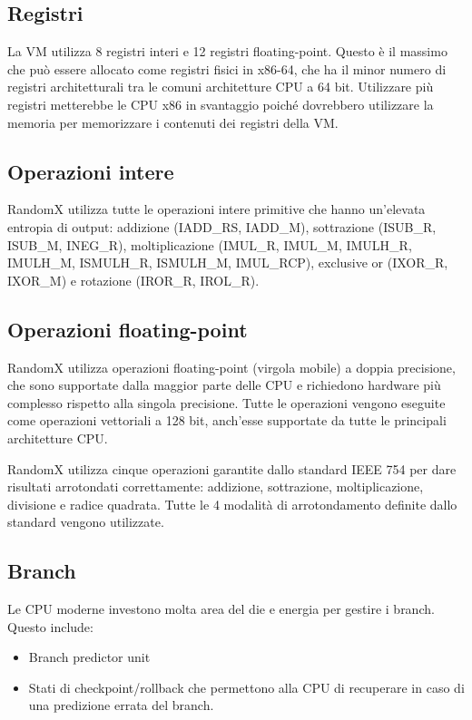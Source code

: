 \subsection{Registri}

La VM utilizza 8 registri interi e 12 registri floating-point. Questo è il massimo che può essere allocato come registri fisici in x86-64, che ha il minor numero di registri architetturali tra le comuni architetture CPU a 64 bit. Utilizzare più registri metterebbe le CPU x86 in svantaggio poiché dovrebbero utilizzare la memoria per memorizzare i contenuti dei registri della VM.

\subsection{Operazioni intere}

RandomX utilizza tutte le operazioni intere primitive che hanno un'elevata entropia di output: addizione (IADD\_RS, IADD\_M), sottrazione (ISUB\_R, ISUB\_M, INEG\_R), moltiplicazione (IMUL\_R, IMUL\_M, IMULH\_R, IMULH\_M, ISMULH\_R, ISMULH\_M, IMUL\_RCP), exclusive or (IXOR\_R, IXOR\_M) e rotazione (IROR\_R, IROL\_R).

\subsection{Operazioni floating-point}

RandomX utilizza operazioni floating-point (virgola mobile) a doppia precisione, che sono supportate dalla maggior parte delle CPU e richiedono hardware più complesso rispetto alla singola precisione. Tutte le operazioni vengono eseguite come operazioni vettoriali a 128 bit, anch'esse supportate da tutte le principali architetture CPU.

RandomX utilizza cinque operazioni garantite dallo standard IEEE 754 per dare risultati arrotondati correttamente: addizione, sottrazione, moltiplicazione, divisione e radice quadrata. Tutte le 4 modalità di arrotondamento definite dallo standard vengono utilizzate.

\subsection{Branch}

Le CPU moderne investono molta area del die e energia per gestire i branch. Questo include:

\begin{itemize}
  \item Branch predictor unit
  \item Stati di checkpoint/rollback che permettono alla CPU di recuperare in caso di una predizione errata del branch.
\end{itemize}

